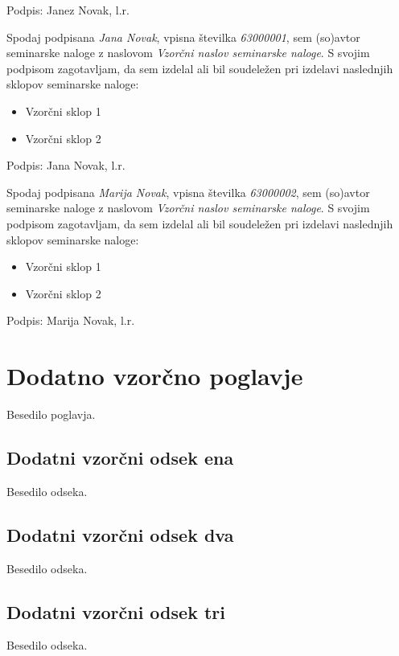 \documentclass[a4paper,12pt]{report}
\newcommand{\naslov}     {Vzorčni naslov seminarske naloge}
\newcommand{\prviavtor}  {Janez Novak}
\newcommand{\drugiavtor} {Jana Novak}
\newcommand{\drugiindeks}{63000001}
\newcommand{\tretjiavtor} {Marija Novak}
\newcommand{\tretjiindeks}{63000002}
\begin{document}
Podpis: {\prviavtor}, l.r.

\newpage

Spodaj podpisana \textit{\drugiavtor}, vpisna številka \textit{\drugiindeks}, sem (so)avtor seminarske naloge z naslovom \textit{\naslov}. S svojim podpisom zagotavljam, da sem izdelal ali bil soudeležen pri izdelavi naslednjih sklopov seminarske naloge:
\begin{itemize}
    \item Vzorčni sklop 1
	 \item Vzorčni sklop 2
\end{itemize}

Podpis: {\drugiavtor}, l.r.

\newpage

Spodaj podpisana \textit{\tretjiavtor}, vpisna številka \textit{\tretjiindeks}, sem (so)avtor seminarske naloge z naslovom \textit{\naslov}. S svojim podpisom zagotavljam, da sem izdelal ali bil soudeležen pri izdelavi naslednjih sklopov seminarske naloge:
\begin{itemize}
    \item Vzorčni sklop 1
	 \item Vzorčni sklop 2
\end{itemize}

Podpis: {\tretjiavtor}, l.r.

\chapter{Dodatno vzorčno poglavje}

Besedilo poglavja.

\section{Dodatni vzorčni odsek ena}

Besedilo odseka.

\section{Dodatni vzorčni odsek dva}

Besedilo odseka.

\section{Dodatni vzorčni odsek tri}

Besedilo odseka.
\end{document}
